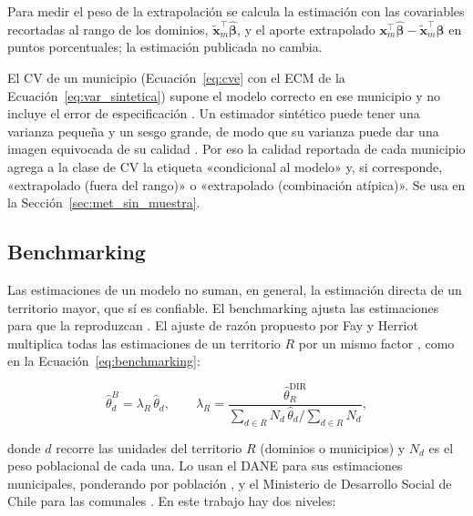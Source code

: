 Para medir el peso de la extrapolación se calcula la estimación con las covariables recortadas al rango de los dominios, $\tilde{\mathbf{x}}_m^\top\hat{\boldsymbol{\beta}}$, y el aporte extrapolado $\mathbf{x}_m^\top\hat{\boldsymbol{\beta}} - \tilde{\mathbf{x}}_m^\top\hat{\boldsymbol{\beta}}$ en puntos porcentuales; la estimación publicada no cambia.

El CV de un municipio (Ecuación~\ref{eq:cve} con el ECM de la Ecuación~\ref{eq:var_sintetica}) supone el modelo correcto en ese municipio y no incluye el error de especificación \cite[p.~3]{morales2021smallarea}. Un estimador sintético puede tener una varianza pequeña y un sesgo grande, de modo que su varianza puede dar una imagen equivocada de su calidad \cite[pp.~38--39]{Molina2019}. Por eso la calidad reportada de cada municipio agrega a la clase de CV la etiqueta «condicional al modelo» y, si corresponde, «extrapolado (fuera del rango)» o «extrapolado (combinación atípica)». Se usa en la Sección~\ref{sec:met_sin_muestra}.

\subsection{Benchmarking}
\label{subsec:benchmarking}

Las estimaciones de un modelo no suman, en general, la estimación directa de un territorio mayor, que sí es confiable. El benchmarking ajusta las estimaciones para que la reproduzcan \cite[pp.~24, 76]{Molina2019}. El ajuste de razón propuesto por Fay y Herriot \cite{FayHerriot1979} multiplica todas las estimaciones de un territorio $R$ por un mismo factor \cite[pp.~22--23]{MarinTralmaGuerrero2024}, como en la Ecuación~\ref{eq:benchmarking}:

\begin{equation}
    \hat{\theta}_d^{B} = \lambda_R\,\hat{\theta}_d, \qquad \lambda_R = \frac{\hat{\theta}_R^{\text{DIR}}}{\sum_{d \in R} N_d\,\hat{\theta}_d \big/ \sum_{d \in R} N_d},
    \label{eq:benchmarking}
\end{equation}

donde $d$ recorre las unidades del territorio $R$ (dominios o municipios) y $N_d$ es el peso poblacional de cada una. Lo usan el DANE para sus estimaciones municipales, ponderando por población \cite[pp.~25, 33]{DANE_SAE_2025}, y el Ministerio de Desarrollo Social de Chile para las comunales \cite[p.~7]{Casen2024}. En este trabajo hay dos niveles:

